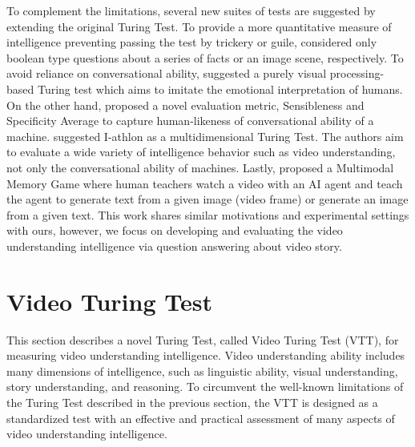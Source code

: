 \documentclass[letterpaper]{article} %
\begin{document}
To complement the limitations, several new suites of tests are suggested by extending the original Turing Test.
To provide a more quantitative measure of intelligence preventing passing the test by trickery or guile, \cite{mckinstry1997minimum,geman2015visual} considered only boolean type questions about a series of facts or an image scene, respectively. 
To avoid reliance on conversational ability, \cite{olague2021less} suggested a purely visual processing-based Turing test which aims to imitate the emotional interpretation of humans. On the other hand, \cite{adiwardana2020meena} proposed a novel evaluation metric, Sensibleness and Specificity Average to capture human-likeness of conversational ability of a machine.
\cite{adams2016athlon} suggested I-athlon as a multidimensional Turing Test. The authors aim to evaluate a wide variety of intelligence behavior such as video understanding, not only the conversational ability of machines. 
Lastly, \cite{zhang2009teaching} proposed a Multimodal Memory Game where human teachers watch a video with an AI agent and teach the agent to generate text from a given image (video frame) or generate an image from a given text. This work shares similar motivations and experimental settings with ours, however, we focus on developing and evaluating the video understanding intelligence via question answering about video story.

\section{Video Turing Test}\label{sec:vtt} %
This section describes a novel Turing Test, called Video Turing Test (VTT), for measuring video understanding intelligence. Video understanding ability includes many dimensions of intelligence, such as linguistic ability, visual understanding, story understanding, and reasoning. To circumvent the well-known limitations of the Turing Test described in the previous section, the VTT is designed as a standardized test with an effective and practical assessment of many aspects of video understanding intelligence.
\end{document}
